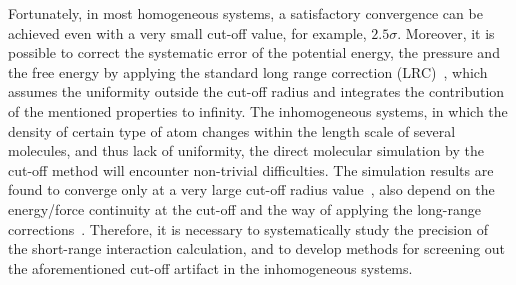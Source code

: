 \documentclass[aps,pre,preprint]{revtex4-1}
\begin{document}
Fortunately,
in most homogeneous systems, a satisfactory convergence can be
achieved even with a very small cut-off value, for example,
$2.5\sigma$.  Moreover, it is possible to correct the systematic error
of the potential energy, the pressure and the free energy by applying
the standard long range correction (LRC)~\cite{allen87a}, which
assumes the uniformity outside the cut-off radius and integrates the
contribution of the mentioned properties to infinity. 
The inhomogeneous systems, in which the density of certain type of
atom changes within the length scale of several molecules, 
and thus lack of uniformity, 
the direct molecular simulation 
by the cut-off method will encounter non-trivial
difficulties.
The simulation results are found to converge only at a very large
cut-off radius value~\cite{duque2004some, ismail2007application}, also
depend on the energy/force continuity at the cut-off and the way of
applying the long-range corrections~\cite{trokhymchuk1999computer,
  guo1997long, mecke1997molecular, janecek2006long, goujon2004monte,
  shen2007comparative}.  Therefore, it is necessary to systematically
study the precision of the short-range interaction calculation, and to
develop methods for screening out the aforementioned cut-off artifact in
the inhomogeneous systems.

\end{document}
